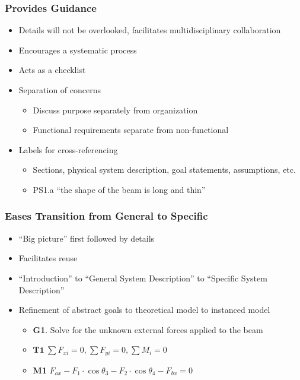 \documentclass[t,12pt,numbers,fleqn]{beamer}
\begin{document}
\begin{frame}
\frametitle{Provides Guidance}
\begin{itemize}
\item Details will not be overlooked, facilitates multidisciplinary collaboration
\item Encourages a systematic process
\item Acts as a checklist
\item Separation of concerns
\begin{itemize}
\item Discuss purpose separately from organization
\item Functional requirements separate from non-functional
\end{itemize}
\item Labels for cross-referencing
\begin{itemize}
\item Sections, physical system description, goal statements, assumptions, etc.
\item PS1.a ``the shape of the beam is long and thin''
\end{itemize}
\end{itemize}
\end{frame}


\begin{frame}
\frametitle{Eases Transition from General to Specific}
\begin{itemize}
\item ``Big picture'' first followed by details
\item Facilitates reuse
\item ``Introduction'' to ``General System Description'' to ``Specific System Description''
\item Refinement of abstract goals to theoretical model to instanced model
\begin{itemize}
\item \textbf{G1}. Solve for the unknown external forces applied to the beam
\item $ \textbf{T1}~ 
\textrm{$\sum{F_{xi}} = 0$,}~  
\textrm{$\sum{F_{yi}} = 0$,}~
\textrm{$\sum{M_i} = 0$}$
\item \textbf{M1} \textrm{$F_{ax} - F_1\cdot \cos\theta_3 - F_2\cdot \cos\theta_4 - F_{bx} = 0$}
\end{itemize}
\end{itemize}
\end{frame}
\end{document}
